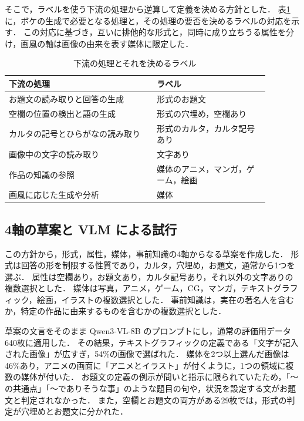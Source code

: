 そこで，ラベルを使う下流の処理から逆算して定義を決める方針とした．
表\ref{tab_downstream}に，ボケの生成で必要となる処理と，その処理の要否を決めるラベルの対応を示す．
この対応に基づき，互いに排他的な形式と，同時に成り立ちうる属性を分け，画風の軸は画像の由来を表す媒体に限定した．

\begin{table}[t]
    \centering
    \caption{下流の処理とそれを決めるラベル}
    \label{tab_downstream}
    \small
    \begin{tabular}{>{\raggedright\arraybackslash}p{0.5\linewidth}>{\raggedright\arraybackslash}p{0.38\linewidth}}
        \toprule
        下流の処理 & ラベル \\
        \midrule
        お題文の読み取りと回答の生成 & 形式のお題文 \\
        空欄の位置の検出と語の生成 & 形式の穴埋め，空欄あり \\
        カルタの記号とひらがなの読み取り & 形式のカルタ，カルタ記号あり \\
        画像中の文字の読み取り & 文字あり \\
        作品の知識の参照 & 媒体のアニメ，マンガ，ゲーム，絵画 \\
        画風に応じた生成や分析 & 媒体 \\
        \bottomrule
    \end{tabular}
\end{table}

\subsection{4軸の草案と VLM による試行}
この方針から，形式，属性，媒体，事前知識の4軸からなる草案を作成した．
形式は回答の形を制限する性質であり，カルタ，穴埋め，お題文，通常から1つを選ぶ．
属性は空欄あり，お題文あり，カルタ記号あり，それ以外の文字ありの複数選択とした．
媒体は写真，アニメ，ゲーム，CG，マンガ，テキストグラフィック，絵画，イラストの複数選択とした．
事前知識は，実在の著名人を含むか，特定の作品に由来するものを含むかの複数選択とした．

草案の文言をそのまま Qwen3-VL-8B のプロンプトにし，通常の評価用データ640枚に適用した．
その結果，テキストグラフィックの定義である「文字が記入された画像」が広すぎ，54\%の画像で選ばれた．
媒体を2つ以上選んだ画像は46\%あり，アニメの画面に「アニメとイラスト」が付くように，1つの領域に複数の媒体が付いた．
お題文の定義の例示が問いと指示に限られていたため，「〜の共通点」「〜でありそうな事」のような題目の句や，状況を設定する文がお題文と判定されなかった．
また，空欄とお題文の両方がある29枚では，形式の判定が穴埋めとお題文に分かれた．

